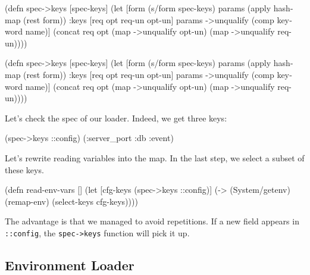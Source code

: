 \ifx\DEVICETYPE\MOBILE

\begin{english}
  \begin{clojure}
(defn spec->keys
  [spec-keys]
  (let [form (s/form spec-keys)
        params (apply hash-map
                 (rest form))
        {:keys [req opt req-un opt-un]}
        params
        ->unqualify (comp keyword name)]
    (concat req
            opt
            (map ->unqualify opt-un)
            (map ->unqualify req-un))))
  \end{clojure}
\end{english}

\else

\begin{english}
  \begin{clojure}
(defn spec->keys
  [spec-keys]
  (let [form (s/form spec-keys)
        params (apply hash-map (rest form))
        {:keys [req opt req-un opt-un]} params
        ->unqualify (comp keyword name)]
    (concat req
            opt
            (map ->unqualify opt-un)
            (map ->unqualify req-un))))
  \end{clojure}
\end{english}

\fi

\noindent
Let's check the spec of our loader. Indeed, we get three keys:

\begin{english}
  \begin{clojure}
(spec->keys ::config)
(:server_port :db :event)
  \end{clojure}
\end{english}

\noindent
Let's rewrite reading variables into the map. In the last step, we select a subset of these keys.

\begin{english}
  \begin{clojure}
(defn read-env-vars []
  (let [cfg-keys (spec->keys ::config)]
    (-> (System/getenv)
        (remap-env)
        (select-keys cfg-keys))))
  \end{clojure}
\end{english}

The advantage is that we managed to avoid repetitions. If a new field appears in \verb|::config|, the \verb|spec->keys| function will pick it up.

\subsection{Environment Loader}

